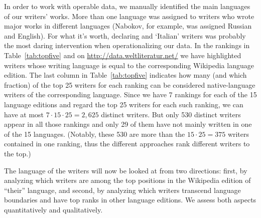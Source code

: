\documentclass[a4paper,12pt]{scrartcl}
\begin{document}
In order to work with operable data, we manually identified the main
languages of our writers' works. More than one language was assigned
to writers who wrote major works in different languages (Nabokov, for
example, was assigned Russian and English).
%
For what it's worth, declaring  and 
`Italian' writers was probably the most daring intervention when
operationalizing our data. 
%
In the rankings in Table~\ref{tab:topfive} and on
\url{http://data.weltliteratur.net/} we have highlighted writers whose
writing language is equal to the corresponding Wikipedia language
edition.
%
The last column in Table~\ref{tab:topfive} indicates how many (and
which fraction) of the top 25 writers for each ranking can be
considered native-language writers of the corresponding language.
%
Since we have 7 rankings for each of the 15 language editions and
regard the top 25 writers for each such ranking, we can have at most
$7\cdot 15 \cdot 25 = 2,625$ distinct writers. But only 530 distinct
writers appear in all those rankings and only 29 of them have not
mainly written in one of the 15 languages. (Notably, these 530 are
more than the $15\cdot 25 = 375$ writers contained in one ranking,
thus the different approaches rank different writers to the top.)

The language of the writers will now be looked at from two directions:
first, by analyzing which writers are among the top positions in the
Wikipedia edition of ``their'' language, and second, by analyzing which
writers transcend language boundaries and have top ranks in other
language editions.
%
We assess both aspects quantitatively and qualitatively.

\end{document}
